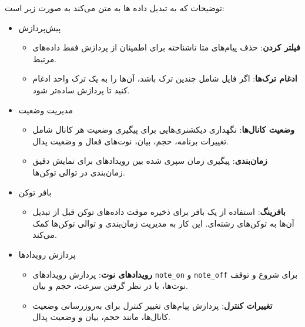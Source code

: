 توضیحات  که به تبدیل داده ها به متن می‌کند به صورت زیر است:
\begin{itemize}
      \item {پیش‌پردازش}
            \begin{itemize}
                  \item
                        \textbf{فیلتر کردن}: حذف پیام‌های متا ناشناخته برای اطمینان از پردازش
                        فقط داده‌های  مرتبط.
                  \item
                        \textbf{ادغام ترک‌ها}: اگر فایل  شامل چندین ترک باشد، آن‌ها را به یک
                        ترک واحد ادغام کنید تا پردازش ساده‌تر شود.
            \end{itemize}

      \item {مدیریت وضعیت}

            \begin{itemize}

                  \item
                        \textbf{وضعیت کانال‌ها}: نگهداری دیکشنری‌هایی برای پیگیری وضعیت هر کانال
                         شامل تغییرات برنامه، حجم، بیان، نوت‌های فعال و وضعیت پدال.
                  \item
                        \textbf{زمان‌بندی}: پیگیری زمان سپری شده بین رویدادهای  برای نمایش
                        دقیق زمان‌بندی در توالی توکن‌ها.
            \end{itemize}

      \item {بافر  توکن}

            \begin{itemize}

                  \item
                        \textbf{بافرینگ}: استفاده از یک بافر برای ذخیره موقت داده‌های توکن قبل
                        از تبدیل آن‌ها به توکن‌های رشته‌ای. این کار به مدیریت زمان‌بندی و توالی
                        توکن‌ها کمک می‌کند.
            \end{itemize}

      \item {پردازش رویدادها}

            \begin{itemize}

                  \item
                        \textbf{رویدادهای نوت}: پردازش رویدادهای \texttt{note\_on} و
                        \texttt{note\_off} برای شروع و توقف نوت‌ها، با در نظر گرفتن سرعت، حجم و
                        بیان.
                  \item
                        \textbf{تغییرات کنترل}: پردازش پیام‌های تغییر کنترل برای به‌روزرسانی
                        وضعیت کانال‌ها، مانند حجم، بیان و وضعیت پدال.
            \end{itemize}


\end{itemize}
